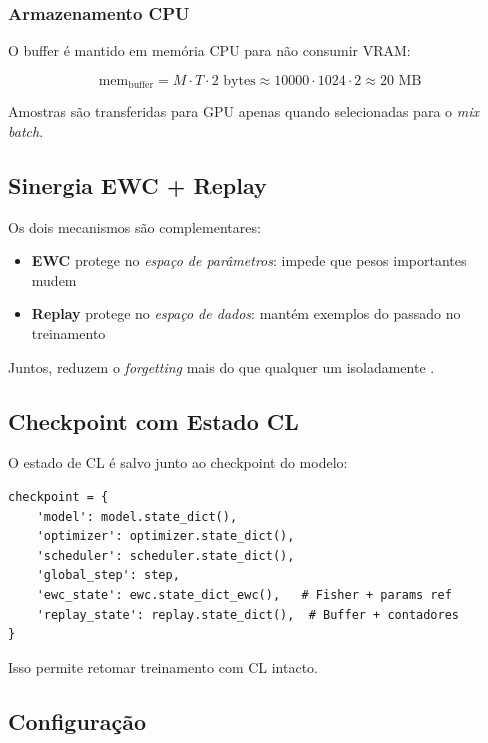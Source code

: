 \subsubsection{Armazenamento CPU}

O buffer \'e mantido em mem\'oria CPU para n\~ao consumir VRAM:

\begin{equation}
    \text{mem}_{\text{buffer}} = M \cdot T \cdot 2 \text{ bytes} \approx 10000 \cdot 1024 \cdot 2 \approx 20 \text{ MB}
\end{equation}

Amostras s\~ao transferidas para GPU apenas quando selecionadas para o
\textit{mix batch}.

\subsection{Sinergia EWC + Replay}

Os dois mecanismos s\~ao complementares:

\begin{itemize}
    \item \textbf{EWC} protege no \textit{espa\c{c}o de par\^ametros}:
    impede que pesos importantes mudem
    \item \textbf{Replay} protege no \textit{espa\c{c}o de dados}:
    mant\'em exemplos do passado no treinamento
\end{itemize}

Juntos, reduzem o \textit{forgetting} mais do que qualquer um isoladamente
\cite{chaudhry2019continual}.

\subsection{Checkpoint com Estado CL}

O estado de CL \'e salvo junto ao checkpoint do modelo:

\begin{lstlisting}[caption={Conte\'udo do checkpoint.}]
checkpoint = {
    'model': model.state_dict(),
    'optimizer': optimizer.state_dict(),
    'scheduler': scheduler.state_dict(),
    'global_step': step,
    'ewc_state': ewc.state_dict_ewc(),   # Fisher + params ref
    'replay_state': replay.state_dict(),  # Buffer + contadores
}
\end{lstlisting}

Isso permite retomar treinamento com CL intacto.

\subsection{Configura\c{c}\~ao}

